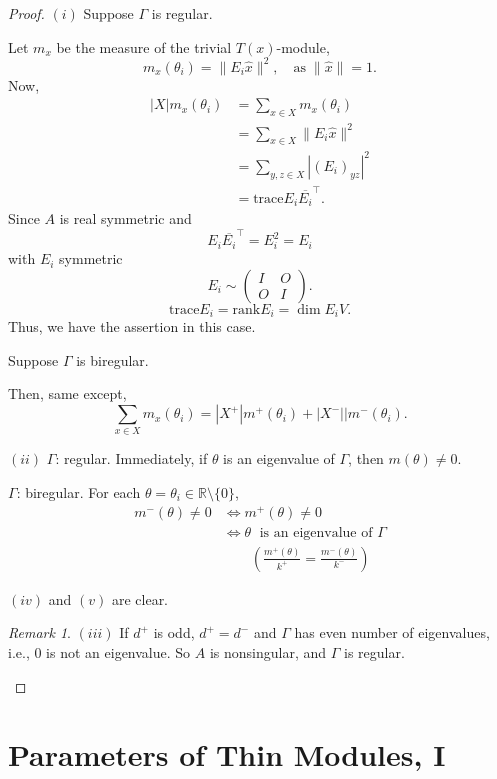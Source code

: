 \documentclass[
]{book}
\newcommand{\rank}{\textrm{rank}}
\theoremstyle{definition}
\theoremstyle{definition}
\theoremstyle{definition}
\theoremstyle{definition}
\theoremstyle{remark}
\newtheorem*{remark}{Remark}
\begin{document}
\begin{proof}

\((i)\) Suppose \(\Gamma\) is regular.

Let \(m_x\) be the measure of the trivial \(T(x)\)-module,
\[m_x(\theta_i) = \|E_i\hat{x}\|^2, \quad \text{as}\; \|\hat{x}\| = 1.\]
Now,
\begin{align}
|X|m_x(\theta_i) & = \sum_{x\in X}m_x(\theta_i)\\
& = \sum_{x\in X}\|E_i\hat{x}\|^2\\
& = \sum_{y,z\in X}|(E_i)_{yz}|^2\\
& = \mathrm{trace} E_i\overline{E_i}^\top.
\end{align}
Since \(A\) is real symmetric and
\[E_i\overline{E_i}^\top = E_i^2 = E_i\]
with \(E_i\) symmetric
\[E_i \sim \begin{pmatrix} I & O \\ O & I\end{pmatrix}.\]
\[\mathrm{trace} E_i = \rank E_i = \dim E_iV.\]
Thus, we have the assertion in this case.

Suppose \(\Gamma\) is biregular.

Then, same except,
\[\sum_{x\in X} m_x(\theta_i) = |X^+|m^+(\theta_i) + |X^-||m^-(\theta_i).\]

\((ii)\)
\(\Gamma\): regular. Immediately, if \(\theta\) is an eigenvalue of \(\Gamma\), then \(m(\theta) \neq 0\).

\(\Gamma\): biregular. For each \(\theta = \theta_i \in \mathbb{R}\setminus\{0\}\),
\begin{align}
m^-(\theta) \neq 0 &\Leftrightarrow m^+(\theta) \neq 0\\
& \Leftrightarrow \theta \; \text{ is an eigenvalue of $\Gamma$}\\
& \quad\quad \left(\frac{m^+(\theta)}{k^+} = \frac{m^-(\theta)}{k^-} \right)
\end{align}

\((iv)\) and \((v)\) are clear.

\begin{remark}
\((iii)\) If \(d^+\) is odd, \(d^+ = d^-\) and \(\Gamma\) has even number of eigenvalues, i.e., \(0\) is not an eigenvalue.
So \(A\) is nonsingular, and \(\Gamma\) is regular.
\end{remark}

\end{proof}

\hypertarget{lec14}{%
\chapter{Parameters of Thin Modules, I}\label{lec14}}
\end{document}
